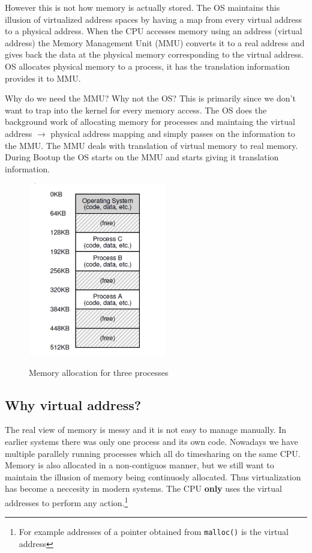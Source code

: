 \documentclass[12pt]{article}
\begin{document}
However this is not how memory is actually stored. The OS maintains this illusion of virtualized address spaces by having a map from every virtual address to a physical address. When the CPU accesses memory 
using an address (virtual address) the Memory Management Unit (MMU) converts it to a real address and gives back the data at the physical memory corresponding to the virtual address. OS allocates physical memory to a process, it has the translation information
provides it to MMU.

Why do we need the MMU? Why not the OS? This is primarily since we don't want to trap into the kernel for every memory access. The OS does the background work
of allocating memory for processes and maintaing the virtual address $\rightarrow$ physical address mapping and simply passes on the information to the MMU.
The MMU deals with translation of virtual memory to real memory. During Bootup the OS starts on the MMU and starts giving it translation information.
\begin{figure}
    \begin{center}
        \includegraphics[width = 6cm]{memory_allocation.png}
        \label{figure:memory_alloc}
        \caption{Memory allocation for three processes}
    \end{center}
\end{figure}


\subsection*{Why virtual address?}
The real view of memory is messy and it is not easy to manage manually. In earlier systems there was only one process and its own code. Nowadays we have multiple
parallely running processes which all do time\-sharing on the same CPU. Memory is also allocated in a non-contiguos manner, but we still want to maintain the illusion of memory being continuosly allocated. 
Thus virtualization has become a neccesity in modern systems. The CPU \textbf{only} uses the virtual addresses to perform any action.\footnote{For example addresses of a pointer obtained from \texttt{malloc()} is the virtual address}
\end{document}
